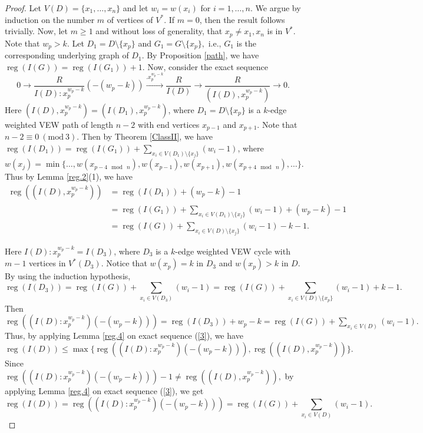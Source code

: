 \documentclass[11pt,reqno]{amsart}
\newcommand{\reg}{\operatorname{reg}}
\theoremstyle{definition}
\begin{document}
\begin{proof}
Let $ V(D)=\{x_1,\ldots,x_n\} $ and let $ w_i=w(x_i)  $ for $i=1, \ldots, n.$ We argue by induction on the number $m$ of vertices of $V^*$.  If $m=0$, then the result follows trivially. Now, let $m \geq 1$ and  without loss of generality, that $x_p \neq x_1, x_n$ is in $V^*$. Note that $w_p >k$.
	Let $ D_1 = D \setminus \{x_p\} $ and  $ G_1=G \setminus \{x_p\} ,$      i.e., $ G_1 $ is  the corresponding underlying graph of $D_1 $.      
	By Proposition \ref{path}, we have $ \reg(I(G)) = \reg(I(G_1)) + 1.$ 	
	Now, consider the exact sequence  
	\begin{equation}\label{3}
		0 \longrightarrow {\frac{R}{I(D):x_p^{w_p - k} }}(-(w_p-k)) \xrightarrow{.x_p^{w_p - k}} {\frac{R}{I(D) }} \longrightarrow {\frac{R}{(I(D),x_p^{w_p - k}) }} \longrightarrow 0 .
	\end{equation}
	Here $(I(D),x_p^{w_p - k})= (I(D_1),x_p^{w_p - k})$, where  $ D_1 = D \setminus \{x_p\} $ is a $k$-edge weighted VEW path of length $ n-2 $ with end vertices $x_{p-1}$ and $x_{p+1}$. Note that $n-2\equiv 0~(\mbox{mod}~3)$. Then by Theorem \ref{ClassII}, we have $   \reg(I(D_1))=  \reg(I(G_1)) +   \displaystyle{ \sum_{x_i \in V(D_1)\setminus \{x_j\}}}(w_i - 1)$,
	 where  $ w(x_j) = \min\{\ldots, w(x_{p-4 \mod~n}),  w(x_{p-1}),     w(x_{p+1}), w(x_{p+4 \mod~n}),\ldots\}.$    
	Thus by  Lemma \ref{reg.2}(1), we have  
	\begin{align*}
		\reg((I(D),x_p^{w_p - k}))&= \reg(I(D_1))+ (w_p -k) -1\\
		&=  \reg(I(G_1)) +   \displaystyle{ \sum_{x_i \in V(D_1) \setminus \{x_j\}}}(w_i - 1)+ (w_p -k) -1\\  
		&=  \reg(I(G)) +   \displaystyle{ \sum_{x_i \in V(D)\setminus \{x_j\}}}(w_i - 1) - k - 1.
	\end{align*}
	
	Here $I(D):x_p^{w_p - k}=I(D_3)$, where $ D_3 $ is a $k$-edge weighted VEW cycle with $m-1$  vertices in $V^*(D_3)$. Notice that $w(x_p)=k$ in $D_3$ and $w(x_p) > k$ in $D$. By using the induction hypothesis,$$ \reg(I(D_3))=  \reg(I(G)) +   \displaystyle{ \sum_{x_i \in V(D_3)}}(w_i - 1)=  \reg(I(G)) +   \displaystyle{ \sum_{x_i \in V(D)\setminus \{x_p\}}}(w_i - 1)+k-1.$$
	Then   $\reg((I(D):x_p^{w_p - k})(-(w_p-k)))=\reg(I(D_3)) + w_p - k =\reg(I(G)) +   \displaystyle{ \sum_{x_i \in V(D)}}(w_i - 1).$ Thus, by applying Lemma \ref{reg.4} on exact sequence (\ref{3}), we have
	$$ \reg(I(D)) \leq \max\{\reg((I(D):x_p^{w_p - k})(-(w_p-k))),\reg((I(D),x_p^{w_p - k}))\} .$$  
	Since $\reg((I(D):x_p^{w_p - k})(-(w_p-k))) - 1  \neq  \reg((I(D),x_p^{w_p - k})),$ by applying Lemma \ref{reg.4} on exact sequence (\ref{3}), we get 
	$$ \reg(I(D))= \reg((I(D):x_p^{w_p - k})(-(w_p-k)))=\reg(I(G)) +   \displaystyle{ \sum_{x_i \in V(D)}}(w_i - 1) . $$  	 
	
\end{proof}
\end{document}
